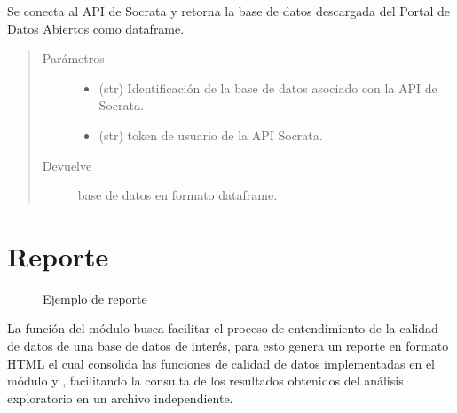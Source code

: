 \documentclass[letterpaper,10pt,openany,spanish]{sphinxmanual}
\begin{document}
\begin{fulllineitems}
\label{\detokenize{metadatos:metadatos.sodapy_base}}
Se conecta al API de Socrata y retorna la base de datos descargada del Portal de Datos Abiertos
como dataframe.
\begin{quote}\begin{description}
\item[{Parámetros}] \leavevmode\begin{itemize}
\item {} 
 \textendash{} (str) Identificación de la base de datos asociado con la API de Socrata.

\item {} 
 \textendash{} (str)  \sphinxhyphen{} token de usuario de la API Socrata.

\end{itemize}

\item[{Devuelve}] \leavevmode
base de datos en formato dataframe.

\end{description}\end{quote}

\end{fulllineitems}



\chapter{Reporte}
\label{\detokenize{reporte:reporte}}\label{\detokenize{reporte:id1}}\label{\detokenize{reporte::doc}}
\begin{figure}[htbp]
\centering
\capstart

\noindent{}
\caption{Ejemplo de reporte}\label{\detokenize{reporte:id2}}\end{figure}

La función  del módulo  busca facilitar el proceso de entendimiento de la calidad de datos de una base de datos de interés, para esto genera un reporte en formato HTML el cual consolida las funciones de calidad de datos implementadas en el módulo {\hyperref[\detokenize{datos:datos}]{}} y {\hyperref[\detokenize{metadatos:metadatos}]{}}, facilitando la consulta de los resultados obtenidos del análisis exploratorio en un archivo independiente.
\end{document}
